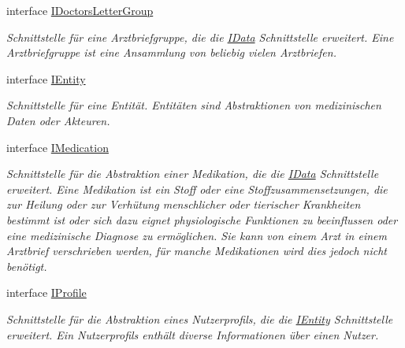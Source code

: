 \begin{CompactItemize}
interface \hyperlink{interfacemy_m_d_1_1_model_interface_1_1_data_model_interface_1_1_i_doctors_letter_group}{IDoctors\-Letter\-Group}
\begin{CompactList}\small\item\em Schnittstelle f\"{u}r eine Arztbriefgruppe, die die \hyperlink{interfacemy_m_d_1_1_model_interface_1_1_data_model_interface_1_1_i_data}{IData} Schnittstelle erweitert. Eine Arztbriefgruppe ist eine Ansammlung von beliebig vielen Arztbriefen. \item\end{CompactList}\item 
interface \hyperlink{interfacemy_m_d_1_1_model_interface_1_1_data_model_interface_1_1_i_entity}{IEntity}
\begin{CompactList}\small\item\em Schnittstelle f\"{u}r eine Entit\"{a}t. Entit\"{a}ten sind Abstraktionen von medizinischen Daten oder Akteuren. \item\end{CompactList}\item 
interface \hyperlink{interfacemy_m_d_1_1_model_interface_1_1_data_model_interface_1_1_i_medication}{IMedication}
\begin{CompactList}\small\item\em Schnittstelle f\"{u}r die Abstraktion einer Medikation, die die \hyperlink{interfacemy_m_d_1_1_model_interface_1_1_data_model_interface_1_1_i_data}{IData} Schnittstelle erweitert. Eine Medikation ist ein Stoff oder eine Stoffzusammensetzungen, die zur Heilung oder zur Verh\"{u}tung menschlicher oder tierischer Krankheiten bestimmt ist oder sich dazu eignet physiologische Funktionen zu beeinflussen oder eine medizinische Diagnose zu erm\"{o}glichen. Sie kann von einem Arzt in einem Arztbrief verschrieben werden, f\"{u}r manche Medikationen wird dies jedoch nicht ben\"{o}tigt. \item\end{CompactList}\item 
interface \hyperlink{interfacemy_m_d_1_1_model_interface_1_1_data_model_interface_1_1_i_profile}{IProfile}
\begin{CompactList}\small\item\em Schnittstelle f\"{u}r die Abstraktion eines Nutzerprofils, die die \hyperlink{interfacemy_m_d_1_1_model_interface_1_1_data_model_interface_1_1_i_entity}{IEntity} Schnittstelle erweitert. Ein Nutzerprofils enth\"{a}lt diverse Informationen \"{u}ber einen Nutzer. \item\end{CompactList}\end{CompactItemize}
